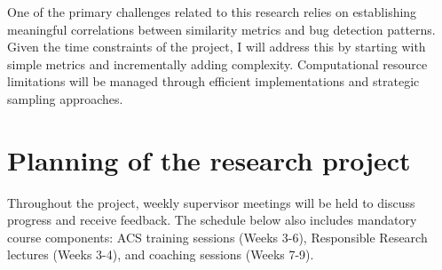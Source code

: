 \documentclass[english, a4paper]{article}
\begin{document}
One of the primary challenges related to this research relies on establishing meaningful correlations between similarity metrics and bug detection patterns. Given the time constraints of the project, I will address this by starting with simple metrics and incrementally adding complexity. Computational resource limitations will be managed through efficient implementations and strategic sampling approaches.

\section*{Planning of the research project}

Throughout the project, weekly supervisor meetings will be held to discuss progress and receive feedback. The schedule below also includes mandatory course components: ACS training sessions (Weeks 3-6), Responsible Research lectures (Weeks 3-4), and coaching sessions (Weeks 7-9).
\end{document}
